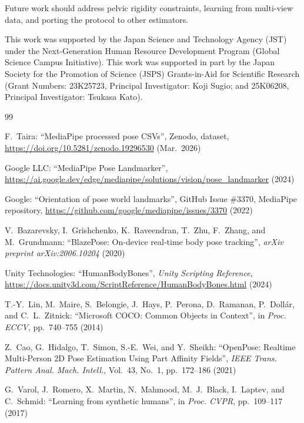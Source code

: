 \documentclass[english,fleqn]{ieej-e}
\begin{document}
Future work should address pelvic rigidity constraints, learning from
multi-view data, and porting the protocol to other estimators.


\acknowledgment

This work was supported by the Japan Science and Technology Agency (JST)
under the Next-Generation Human Resource Development Program (Global Science
Campus Initiative).
This work was supported in part by the Japan Society for the Promotion of
Science (JSPS) Grants-in-Aid for Scientific Research (Grant Numbers:
23K25723, Principal Investigator: Koji Sugio; and 25K06208, Principal
Investigator: Tsukasa Kato).


\begin{thebibliography}{99}

F.~Taira: ``MediaPipe processed pose CSVs'', Zenodo, dataset,
\url{https://doi.org/10.5281/zenodo.19296530} (Mar.~2026)

Google LLC: ``MediaPipe Pose Landmarker'',
\url{https://ai.google.dev/edge/mediapipe/solutions/vision/pose_landmarker}
(2024)

Google: ``Orientation of pose world landmarks'', GitHub Issue \#3370,
MediaPipe repository,
\url{https://github.com/google/mediapipe/issues/3370} (2022)

V.~Bazarevsky, I.~Grishchenko, K.~Raveendran, T.~Zhu, F.~Zhang,
and M.~Grundmann: ``BlazePose: On-device real-time body pose tracking'',
\textit{arXiv preprint arXiv:2006.10204} (2020)

Unity Technologies: ``HumanBodyBones'', \textit{Unity Scripting Reference},
\url{https://docs.unity3d.com/ScriptReference/HumanBodyBones.html} (2024)

T.-Y.~Lin, M.~Maire, S.~Belongie, J.~Hays, P.~Perona, D.~Ramanan,
P.~Dollár, and C.~L.~Zitnick:
``Microsoft COCO: Common Objects in Context'',
in \textit{Proc. ECCV}, pp.~740--755 (2014)

Z.~Cao, G.~Hidalgo, T.~Simon, S.-E.~Wei, and Y.~Sheikh:
``OpenPose: Realtime Multi-Person 2D Pose Estimation Using Part Affinity
Fields'', \textit{IEEE Trans. Pattern Anal. Mach. Intell.}, Vol.~43,
No.~1, pp.~172--186 (2021)

G.~Varol, J.~Romero, X.~Martin, N.~Mahmood, M.~J.~Black, I.~Laptev,
and C.~Schmid: ``Learning from synthetic humans'',
in \textit{Proc. CVPR}, pp.~109--117 (2017)


\end{thebibliography}
\end{document}
